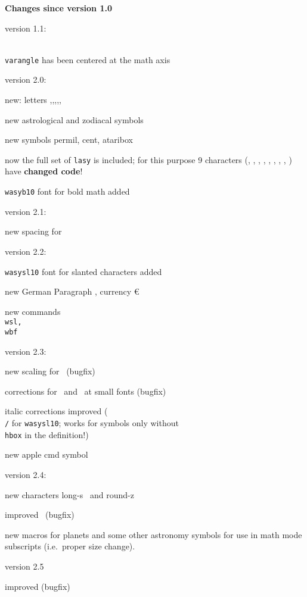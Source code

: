 \bigskip

{\bf Changes since version 1.0}

version 1.1:

{\tt\\varangle} has been centered at the math axis

version 2.0:

new: letters \Thorn,\thorn,\dh,\inve,\openo,\agemO

new astrological and zodiacal symbols

new symbols permil, cent, ataribox

now the full set of
{\tt lasy} is included; for this purpose 9 characters
(\smiley, \blacksmiley, \frownie, \sun,
\jupiter, \saturn, \uranus, \neptune, \pluto) have
{\bf changed code}!

{\tt wasyb10} font for bold math added

version 2.1:

new spacing for \openo

version 2.2:

{\tt wasysl10} font for slanted characters added

new German Paragraph \Paragraph, currency \euro

new commands {\tt \\wsl, \\wbf}

version 2.3:

new scaling for \ataribox\ (bugfix)

corrections for \APLuparrowbox\ and \APLdownarrowbox\ at small fonts (bugfix)

italic corrections improved ({\tt\\/} for {\tt wasysl10}; works for
symbols only without {\tt\\hbox} in the definition!)

new apple cmd symbol \applecmd

version 2.4:

new characters long-s \s\ and round-z \z

improved \opposition\ (bugfix)

new macros for planets and some other astronomy symbols for use
in math mode subscripts (i.e.\ proper size change).

version 2.5

improved {\wbf\z} (bugfix)

\bye

